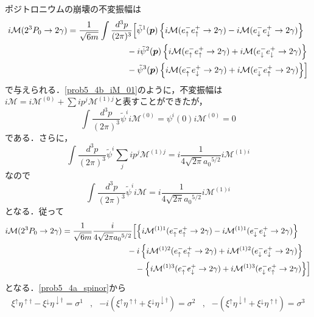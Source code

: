 ポジトロニウムの崩壊の不変振幅は
\begin{align*}
  i\mathcal{M}(2^3P_0 \to 2\gamma) &= \frac{1}{\sqrt{6m}} \int \frac{d^3p}{(2\pi)^3}
  \Bigl[ \tilde{\psi}^1(\boldsymbol{p}) \left\{ i\mathcal{M}(e^-_\uparrow e^+_\uparrow \to 2\gamma) - i\mathcal{M}(e^-_\downarrow e^+_\downarrow \to 2\gamma) \right\} \\
  &\qquad\qquad\qquad\quad - i \tilde{\psi}^2(\boldsymbol{p}) \left\{ i\mathcal{M}(e^-_\uparrow e^+_\uparrow \to 2\gamma) + i\mathcal{M}(e^-_\downarrow e^+_\downarrow \to 2\gamma) \right\} \\
  &\qquad\qquad\qquad\quad - \tilde{\psi}^3(\boldsymbol{p}) \left\{ i\mathcal{M}(e^-_\uparrow e^+_\downarrow \to 2\gamma) + i\mathcal{M}(e^-_\downarrow e^+_\uparrow \to 2\gamma) \right\} \Bigr]
\end{align*}
で与えられる．\eqref{prob5_4b_iM_01}のように，不変振幅は$i\mathcal{M} = i\mathcal{M}^{(0)} + \sum ip^j \mathcal{M}^{(1)j}$と表すことができたが，
\[ \int \frac{d^3p}{(2\pi)^3} \tilde{\psi}^i i\mathcal{M}^{(0)} = \psi^i(0) i\mathcal{M}^{(0)} = 0 \]
である．さらに，
\[ \int \frac{d^3p}{(2\pi)^3} \tilde{\psi}^i \sum_j i p^j \mathcal{M}^{(1)j} = i \frac{1}{4\sqrt{2\pi} a_0{}^{5/2}} i\mathcal{M}^{(1)i} \]
なので
\[ \int \frac{d^3p}{(2\pi)^3} \tilde{\psi}^i i \mathcal{M} = i \frac{1}{4\sqrt{2\pi} a_0{}^{5/2}} i\mathcal{M}^{(1)i} \]
となる．従って
\begin{align*}
  i\mathcal{M}(2^3P_0 \to 2\gamma) &= \frac{1}{\sqrt{6m}} \frac{i}{4\sqrt{2\pi} a_0{}^{5/2}}
  \Bigl[ \left\{ i\mathcal{M}^{(1)1}(e^-_\uparrow e^+_\uparrow \to 2\gamma) - i\mathcal{M}^{(1)1}(e^-_\downarrow e^+_\downarrow \to 2\gamma) \right\} \\
  &\qquad\qquad\qquad\qquad - i \left\{ i\mathcal{M}^{(1)2}(e^-_\uparrow e^+_\uparrow \to 2\gamma) + i\mathcal{M}^{(1)2}(e^-_\downarrow e^+_\downarrow \to 2\gamma) \right\} \\
  &\qquad\qquad\qquad\qquad\quad - \left\{ i\mathcal{M}^{(1)3}(e^-_\uparrow e^+_\downarrow \to 2\gamma) + i\mathcal{M}^{(1)3}(e^-_\downarrow e^+_\uparrow \to 2\gamma) \right\} \Bigr]
\end{align*}
となる．\eqref{prob5_4a_spinor}から
\begin{align*}
  \xi^\uparrow\eta^{\uparrow\dagger} - \xi^\downarrow\eta^{\downarrow\dagger} = \sigma^1
  & , &
  -i (\xi^\uparrow\eta^{\uparrow\dagger} + \xi^\downarrow\eta^{\downarrow\dagger}) = \sigma^2
  & , &
  - (\xi^\uparrow\eta^{\downarrow\dagger} + \xi^\downarrow\eta^{\uparrow\dagger}) = \sigma^3
\end{align*}
